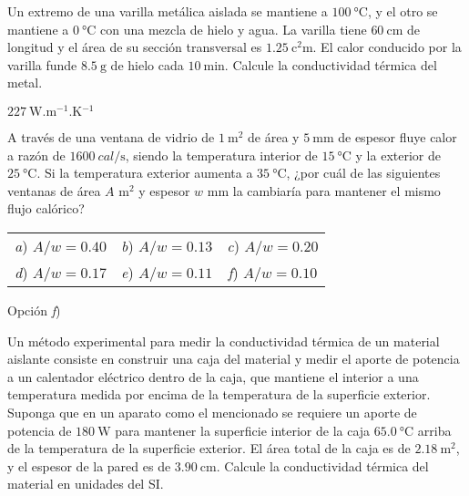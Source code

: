 \setcounter{figure}{0}
%
\begin{Exercise}
  Un extremo de una varilla metálica aislada se mantiene a $\SI{100}{\celsius}$, y el otro se mantiene a $\SI{0}{\celsius}$ con una mezcla de hielo y agua. La varilla tiene $\SI{60}{\centi\metre}$ de longitud y el área de su sección transversal es $\SI{1.25}{\square\centi\metre}$. El calor conducido por la varilla funde $\SI{8.5}{\gram}$ de hielo cada $\SI{10}{\minute}$. Calcule la conductividad térmica del metal.
\end{Exercise}
\begin{Answer}
  $\SI{227}{\watt.\metre^{-1}.\kelvin^{-1}}$
\end{Answer}
%
\begin{Exercise}
  A través de una ventana de vidrio de $\SI{1}{\square\metre}$ de área y $\SI{5}{\milli\metre}$ de espesor fluye calor a razón de $\SI{1600}{cal/\second}$, siendo la temperatura interior de $\SI{15}{\celsius}$ y la exterior de $\SI{25}{\celsius}$. Si la temperatura exterior aumenta a $\SI{35}{\celsius}$, ¿por cuál de las siguientes ventanas de área $A$ $\si{\square\metre}$ y espesor $w$ $\si{\milli\metre}$ la cambiaría para mantener el mismo flujo calórico?\\
\begin{tabular*}{0.8\textwidth}{ccc}
  \textit{a}) $A/w=0.40$ & \textit{b}) $A/w=0.13$ & \textit{c}) $A/w=0.20$\\
  \textit{d}) $A/w=0.17$ & \textit{e}) $A/w=0.11$ & \textit{f}) $A/w=0.10$\\
\end{tabular*}
\end{Exercise}
\begin{Answer}
  Opción \textit{f})
\end{Answer}
%
\begin{Exercise}
  Un método experimental para medir la conductividad térmica de un material aislante consiste en construir una caja del material y medir el aporte de potencia a un calentador eléctrico dentro de la caja, que mantiene el interior a una temperatura medida por encima de la temperatura de la superficie exterior. Suponga que en un aparato como el mencionado se requiere un aporte de potencia de $\SI{180}{\watt}$ para mantener la superficie interior de la caja $\SI{65.0}{\celsius}$ arriba de la temperatura de la superficie exterior. El área total de la caja es de $\SI{2.18}{\square\metre}$, y el espesor de la pared es de $\SI{3.90}{\centi\metre}$. Calcule la conductividad térmica del material en unidades del SI.
\end{Exercise}
